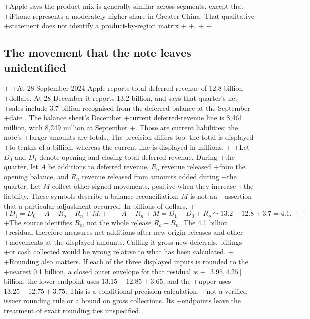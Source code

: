+Apple says the product mix is generally similar across segments, except that
+iPhone represents a moderately higher share in Greater China. That qualitative
+statement does not identify a product-by-region matrix
+\citep[Notes 2 and 13, printed pp.~35--36 and 46--47]{apple2024}
+\citep[Notes 2 and 10, printed pp.~6 and 11]{apple2025q1}.
+
+\subsection{The movement that the note leaves unidentified}
+
+At 28 September 2024 Apple reports total deferred revenue of 12.8 billion
+dollars. At 28 December it reports 13.2 billion, and says that quarter's net
+sales include 3.7 billion recognised from the deferred balance at the September
+date \citep[Note 2, printed p.~6]{apple2025q1}. The balance sheet's December
+current deferred-revenue line is 8,461 million, with 8,249 million at September
+\citep[printed p.~3]{apple2025q1}. Those are current liabilities; the note's
+larger amounts are totals. The precision differs too: the total is displayed
+to tenths of a billion, whereas the current line is displayed in millions.
+
+Let $D_0$ and $D_1$ denote opening and closing total deferred revenue. During
+the quarter, let $A$ be additions to deferred revenue, $R_o$ revenue released
+from the opening balance, and $R_n$ revenue released from amounts added during
+the quarter. Let $M$ collect other signed movements, positive when they increase
+the liability. These symbols describe a balance reconciliation; $M$ is not an
+assertion that a particular adjustment occurred. In billions of dollars,
+\begin{equation}
+ D_1=D_0+A-R_o-R_n+M,
+ \qquad A-R_n+M=D_1-D_0+R_o\simeq13.2-12.8+3.7=4.1.
+ \label{eq:apple-deferred-movement}
+\end{equation}
+The source identifies $R_o$, not the whole release $R_o+R_n$. The 4.1 billion
+residual therefore measures net additions after new-origin releases and other
+movements at the displayed amounts. Calling it gross new deferrals, billings
+or cash collected would be wrong relative to what has been calculated.
+
+Rounding also matters. If each of the three displayed inputs is rounded to the
+nearest 0.1 billion, a closed outer envelope for that residual is
+$[3.95,4.25]$ billion: the lower endpoint uses $13.15-12.85+3.65$, and the
+upper uses $13.25-12.75+3.75$. This is a conditional precision calculation,
+not a verified issuer rounding rule or a bound on gross collections. Its
+endpoints leave the treatment of exact rounding ties unspecified.
